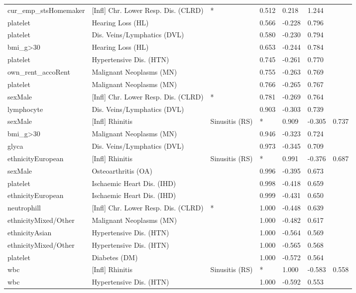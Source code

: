 \begin{tabular}{llllll}
  cur_emp_stsHomemaker & [Infl] Chr. Lower Resp. Dis. (CLRD) & * & 0.512 & 0.218 & 1.244 \\ 
  platelet & Hearing Loss (HL) &  & 0.566 & -0.228 & 0.796 \\ 
  platelet & Dis. Veins/Lymphatics (DVL) &  & 0.580 & -0.230 & 0.794 \\ 
  bmi_g>30 & Hearing Loss (HL) &  & 0.653 & -0.244 & 0.784 \\ 
  platelet & Hypertensive Dis. (HTN) &  & 0.745 & -0.261 & 0.770 \\ 
  own_rent_accoRent & Malignant Neoplasms (MN) &  & 0.755 & -0.263 & 0.769 \\ 
  platelet & Malignant Neoplasms (MN) &  & 0.766 & -0.265 & 0.767 \\ 
  sexMale & [Infl] Chr. Lower Resp. Dis. (CLRD) & * & 0.781 & -0.269 & 0.764 \\ 
  lymphocyte & Dis. Veins/Lymphatics (DVL) &  & 0.903 & -0.303 & 0.739 \\ 
  sexMale & [Infl] Rhinitis & Sinusitis (RS) & * & 0.909 & -0.305 & 0.737 \\ 
  bmi_g>30 & Malignant Neoplasms (MN) &  & 0.946 & -0.323 & 0.724 \\ 
  glyca & Dis. Veins/Lymphatics (DVL) &  & 0.973 & -0.345 & 0.709 \\ 
  ethnicityEuropean & [Infl] Rhinitis & Sinusitis (RS) & * & 0.991 & -0.376 & 0.687 \\ 
  sexMale & Osteoarthritis (OA) &  & 0.996 & -0.395 & 0.673 \\ 
  platelet & Ischaemic Heart Dis. (IHD) &  & 0.998 & -0.418 & 0.659 \\ 
  ethnicityEuropean & Ischaemic Heart Dis. (IHD) &  & 0.999 & -0.431 & 0.650 \\ 
  neutrophill & [Infl] Chr. Lower Resp. Dis. (CLRD) & * & 1.000 & -0.448 & 0.639 \\ 
  ethnicityMixed/Other & Malignant Neoplasms (MN) &  & 1.000 & -0.482 & 0.617 \\ 
  ethnicityAsian & Hypertensive Dis. (HTN) &  & 1.000 & -0.564 & 0.569 \\ 
  ethnicityMixed/Other & Hypertensive Dis. (HTN) &  & 1.000 & -0.565 & 0.568 \\ 
  platelet & Diabetes (DM) &  & 1.000 & -0.572 & 0.564 \\ 
  wbc & [Infl] Rhinitis & Sinusitis (RS) & * & 1.000 & -0.583 & 0.558 \\ 
  wbc & Hypertensive Dis. (HTN) &  & 1.000 & -0.592 & 0.553 \\ 

\end{tabular}
